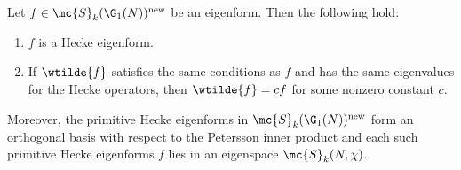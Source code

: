     \begin{theorem}\label{thm:newforms_characterization_holomorphic}
      Let $f \in \mc{S}_{k}(\G_{1}(N))^{\mathrm{new}}$ be an eigenform. Then the following hold:
      \begin{enumerate}[label=(\roman*)]
        \item $f$ is a Hecke eigenform.
        \item If $\wtilde{f}$ satisfies the same conditions as $f$ and has the same eigenvalues for the Hecke operators, then $\wtilde{f} = cf$ for some nonzero constant $c$.
      \end{enumerate}
      Moreover, the primitive Hecke eigenforms in $\mc{S}_{k}(\G_{1}(N))^{\mathrm{new}}$ form an orthogonal basis with respect to the Petersson inner product and each such primitive Hecke eigenforms $f$ lies in an eigenspace $\mc{S}_{k}(N,\chi)$.
    \end{theorem}
